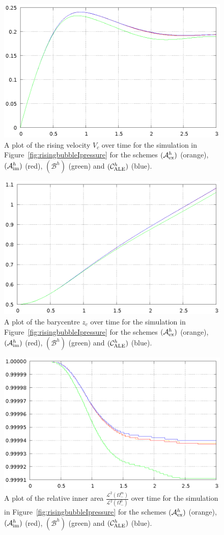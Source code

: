 \documentclass[a4paper,12pt,onecolumn]{article}
\newcommand{\schemeAex}{{\mathcal{A}^h_{\rm ex}}}
\newcommand{\schemeAim}{{\mathcal{A}^h_{\rm im}}}
\newcommand{\schemeB}{{\mathcal{B}^h}}
\newcommand{\schemeALE}{{\mathcal{C}^h_{\rm ALE}}}
\begin{document}
\begin{figure}[htbp]
\centering
\includegraphics[width=.45\textwidth]
{figures/rising_bubble_I_rising_velocity.ps}
\caption{A plot of the rising velocity $V_c$ over time for the simulation in
Figure~\ref{fig:risingbubbleIpressure} for the schemes
$(\schemeAex)$ (orange), $(\schemeAim)$ (red), $(\schemeB)$ (green) and
$(\schemeALE)$ (blue).}
\label{fig:risingbubbleIrisingvelocity}
\end{figure}%
\begin{figure}[htbp]
\centering
\includegraphics[width=.45\textwidth]
{figures/rising_bubble_I_barycenter.ps}
\caption{A plot of the barycentre $z_c$ over time for the simulation in
Figure~\ref{fig:risingbubbleIpressure} for the schemes
$(\schemeAex)$ (orange), $(\schemeAim)$ (red), $(\schemeB)$ (green) and
$(\schemeALE)$ (blue).}
\label{fig:risingbubbleIbarycenter}
\end{figure}%
\begin{figure}[htbp]
\centering
\includegraphics[width=.45\textwidth]
{figures/rising_bubble_I_inner_volume.ps}
\caption{A plot of the relative inner area
$\frac{\mathcal{L}^2(\Omega^m_-)}{\mathcal{L}^2(\Omega^0_-)}$ over time for the
simulation in Figure~\ref{fig:risingbubbleIpressure} for the schemes
$(\schemeAex)$ (orange), $(\schemeAim)$ (red), $(\schemeB)$ (green) and
$(\schemeALE)$ (blue).}
\label{fig:risingbubbleIinnervolume}
\end{figure}%
\end{document}
